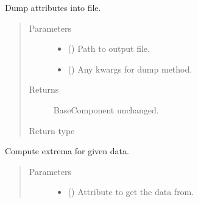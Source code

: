 \documentclass[letterpaper,10pt,english]{sphinxmanual}
\begin{document}
\begin{fulllineitems}
\begin{fulllineitems}
\end{fulllineitems}


\begin{fulllineitems}
\label{\detokenize{api/states:geology.src.States.dump}}
Dump attributes into file.
\begin{quote}\begin{description}
\item[{Parameters}] \leavevmode\begin{itemize}
\item {} 
 () \textendash{} Path to output file.

\item {} 
 (\sphinxstyleliteralemphasis{\sphinxupquote{, }}) \textendash{} Any kwargs for dump method.

\end{itemize}

\item[{Returns}] \leavevmode
{} \textendash{} BaseComponent unchanged.

\item[{Return type}] \leavevmode
{\hyperref[\detokenize{api/base_classes:geology.src.base_component.BaseComponent}]{}}

\end{description}\end{quote}

\end{fulllineitems}


\begin{fulllineitems}
\label{\detokenize{api/states:geology.src.States.extrema}}
Compute extrema for given data.
\begin{quote}\begin{description}
\item[{Parameters}] \leavevmode\begin{itemize}
\item {} 
 (\sphinxstyleliteralemphasis{\sphinxupquote{, }}) \textendash{} Attribute to get the data from.


\end{itemize}
\end{description}
\end{quote}
\end{fulllineitems}
\end{fulllineitems}
\end{document}
